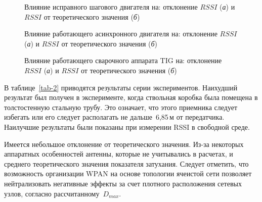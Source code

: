 \begin{figure} [htb]
	\caption{Влияние исправного шагового двигателя на: отклонение $RSSI$ (\textit{а}) и $RSSI$ от теоретического значения (\textit{б})}
	\label{ch-3/fig-8}
\end{figure}

\begin{figure} [htb]
	\caption{Влияние работающего асинхронного двигателя на: отклонение $RSSI$ (\textit{а}) и $RSSI$ от теоретического значения (\textit{б})}
	\label{ch-3/fig-9}
\end{figure}

\begin{figure} [htb]
	\caption{Влияние работающего сварочного аппарата TIG на: отклонение $RSSI$ (\textit{а}) и $RSSI$ от теоретического значения (\textit{б})}
	\label{ch-3/fig-10}
\end{figure}

В таблице~\cref{tab-2} приводятся результаты серии экспериментов. Наихудший результат был получен в эксперименте, когда ствольная коробка была помещена в толстостенную стальную трубу. Это означает, что этого приемника следует избегать или его следует располагать не дальше~6,85\,м от передатчика. Наилучшие результаты были показаны при измерении RSSI в свободной среде.

Имеется небольшое отклонение от теоретического значения. Из-за некоторых аппаратных особенностей антенны, которые не учитывались в расчетах, и среднего теоретического значения показателя затухания. Следует отметить, что возможность организации WPAN на основе топологии ячеистой сети позволяет нейтрализовать негативные эффекты за счет плотного расположения сетевых узлов, согласно рассчитанному~$D_{max}$.

